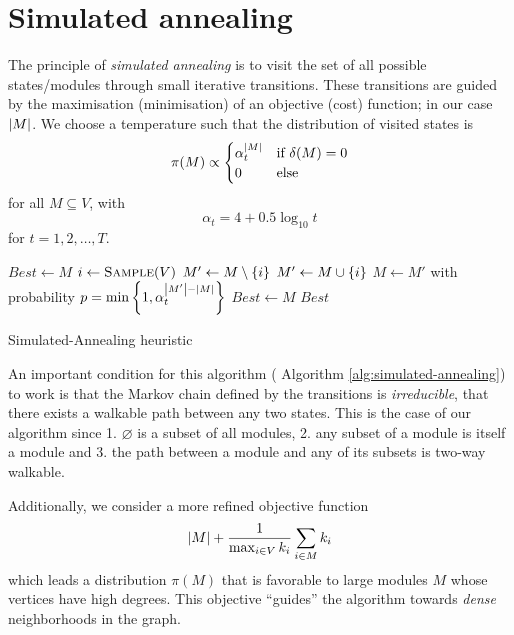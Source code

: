 \documentclass[a4paper, 12pt]{article}
\begin{document}
    \section{Simulated annealing} \label{sec:Simulated annealing}
    
    The principle of \emph{simulated annealing} is to visit the set of all possible states/modules through small iterative transitions. These transitions are guided by the maximisation (minimisation) of an objective (cost) function; in our case $\left|M\right|$. We choose a temperature such that the distribution of visited states is
    \begin{equation}
        \pi(M) \propto \begin{cases}
            \alpha_t^{\left|M\right|} & \text{if } \delta(M) = 0 \\
            0 & \text{else}
        \end{cases}
    \end{equation}
    for all $M \subseteq V$, with
    \begin{equation}
        \alpha_t = 4 + \num{0.5} \log_{10} t
    \end{equation}
    for $t = 1, 2, \dots, T$.
	
	\begin{algorithm}[h]
        \begin{algorithmic}[1]
				\State $Best \gets M$
				 
				    \State $i \gets \Call{Sample}{V}$ 
				        \State $M' \gets M \setminus \left\{i\right\}$ 
				    \Else
				        \State $M' \gets M \cup \left\{i\right\}$ 
				    \EndIf
				     
				        \State $M \gets M'$ with probability $p = \min\left\{1, \alpha_t^{\left|M'\right| - \left|M\right|}\right\}$ 
				         $Best \gets M$ \EndIf
				    \EndIf
				\EndFor
				\State \Return $Best$
			\EndFunction
		\end{algorithmic}
		\caption{Simulated-Annealing heuristic}
	    \label{alg:simulated-annealing}
	\end{algorithm}
	
	An important condition for this algorithm (\cf{} Algorithm \ref{alg:simulated-annealing}) to work is that the Markov chain defined by the transitions is \emph{irreducible}, \ie{} that there exists a walkable path between any two states. This is the case of our algorithm since 1. $\varnothing$ is a subset of all modules, 2. any subset of a module is itself a module and 3. the path between a module and any of its subsets is two-way walkable.
	
	Additionally, we consider a more refined objective function
	\begin{equation}
	    \left|M\right| + \frac{1}{\max_{i \in V} k_i} \sum_{i \in M} k_i
	\end{equation}
	which leads a distribution $\pi(M)$ that is favorable to large modules $M$ whose vertices have high degrees. This objective \enquote{guides} the algorithm towards \emph{dense} neighborhoods in the graph.
    
\end{document}
